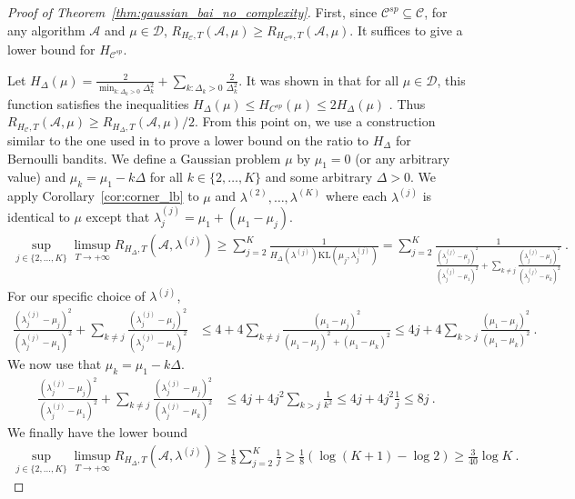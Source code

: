 \documentclass{article}
\newcommand{\KL}{\mathrm{KL}}
\begin{document}
\begin{proof}[Proof of Theorem~\ref{thm:gaussian_bai_no_complexity}]
First, since $\mathcal C^{sp} \subseteq \mathcal C$, for any algorithm $\mathcal A$ and $\mu \in \mathcal D$, $R_{H_{\mathcal C}, T}(\mathcal A, \mu) \ge R_{H_{\mathcal C^{sp}}, T}(\mathcal A, \mu)$. It suffices to give a lower bound for $H_{\mathcal C^{sp}}$.

Let $H_{\Delta}(\mu) = \frac{2}{\min_{k : \Delta_k>0} \Delta_k^2} + \sum_{k:\Delta_k>0} \frac{2}{\Delta_k^2}$. It was shown in \cite{garivier2016optimal} that for all $\mu \in \mathcal D$, this function satisfies the inequalities $H_\Delta(\mu) \le H_{C^{sp}}(\mu) \le 2 H_\Delta(\mu)$ .
Thus $R_{H_{\mathcal C}, T}(\mathcal A, \mu) \ge R_{H_\Delta, T}(\mathcal A, \mu) / 2$. From this point on, we use a construction similar to the one used in \cite{carpentier2016tight} to prove a lower bound on the ratio to $H_\Delta$ for Bernoulli bandits.
We define a Gaussian problem $\mu$ by $\mu_1 = 0$ (or any arbitrary value) and $\mu_k = \mu_1 - k \Delta$ for all $k \in \{2, \ldots, K\}$ and some arbitrary $\Delta > 0$.
We apply Corollary~\ref{cor:corner_lb} to $\mu$ and $\lambda^{(2)}, \ldots, \lambda^{(K)}$ where each $\lambda^{(j)}$ is identical to $\mu$ except that $\lambda^{(j)}_j = \mu_1 + (\mu_1 - \mu_j)$.
\begin{align*}
\sup_{j \in \{2, \ldots, K\}} \limsup_{T\to +\infty} R_{H_\Delta,T}(\mathcal A, \lambda^{(j)})
\ge \sum_{j=2}^K \frac{1}{H_\Delta(\lambda^{(j)}) \KL(\mu_j, \lambda_j^{(j)})}
= \sum_{j=2}^K \frac{1}{\frac{(\lambda_j^{(j)} - \mu_j)^2}{(\lambda_j^{(j)} - \mu_1)^2} + \sum_{k\ne j} \frac{(\lambda_j^{(j)} - \mu_j)^2}{(\lambda_j^{(j)} - \mu_k)^2}}
\: .
\end{align*}
For our specific choice of $\lambda^{(j)}$,
\begin{align*}
\frac{(\lambda_j^{(j)} - \mu_j)^2}{(\lambda_j^{(j)} - \mu_1)^2} + \sum_{k \ne j} \frac{(\lambda_j^{(j)} - \mu_j)^2}{(\lambda_j^{(j)} - \mu_k)^2}
&\le 4 + 4 \sum_{k \ne j} \frac{(\mu_1 - \mu_j)^2}{(\mu_1 - \mu_j)^2 + (\mu_1 - \mu_k)^2}
\le 4 j + 4\sum_{k > j} \frac{(\mu_1 - \mu_j)^2}{(\mu_1 - \mu_k)^2}
\: .
\end{align*}
We now use that $\mu_k = \mu_1 - k \Delta$.
\begin{align*}
\frac{(\lambda_j^{(j)} - \mu_j)^2}{(\lambda_j^{(j)} - \mu_1)^2} + \sum_{k \ne j} \frac{(\lambda_j^{(j)} - \mu_j)^2}{(\lambda_j^{(j)} - \mu_k)^2}
&\le 4 j + 4 j^2 \sum_{k > j} \frac{1}{k^2}
\le 4 j + 4 j^2 \frac{1}{j}
\le 8 j \: .
\end{align*}
We finally have the lower bound
\begin{align*}
\sup_{j \in \{2, \ldots, K\}} \limsup_{T\to +\infty} R_{H_\Delta,T}(\mathcal A, \lambda^{(j)})
\ge \frac{1}{8}\sum_{j=2}^K \frac{1}{j}
\ge \frac{1}{8}(\log(K+1) - \log 2)
\ge \frac{3}{40} \log K
\: .
\end{align*}
\end{proof}
\end{document}

